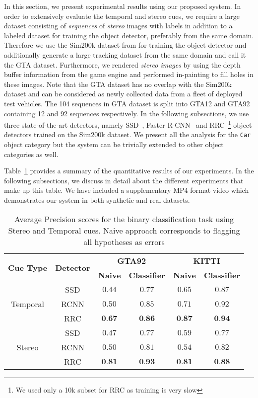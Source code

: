 \documentclass[letterpaper, 10 pt, journal, twoside]{IEEEtran}  %
\begin{document}
In this section, we present experimental results using our proposed system. In order to extensively evaluate the temporal and stereo cues, we require a large dataset consisting of \emph{sequences} of \emph{stereo} images with labels in addition to a labeled dataset for training the object detector, preferably from the same domain. Therefore we use the Sim200k dataset from \cite{johnson2017driving} for training the object detector and additionally generate a large tracking dataset from the same domain and call it the GTA dataset. Furthermore, we rendered \emph{stereo images} by using the depth buffer information from the game engine and performed in-painting \cite{bertalmio2001navier} to fill holes in these images. 
Note that the GTA dataset has no overlap with the Sim200k dataset and can be considered as newly collected data from a fleet of deployed test vehicles. The 104 sequences in GTA dataset is split into GTA12 and GTA92 containing 12 and 92 sequences respectively. In the following subsections, we use three state-of-the-art detectors, namely SSD~\cite{liu2016ssd}, Faster R-CNN~\cite{NIPS2015_5638} and RRC~\cite{ren2017accurate}\footnote{We used only a 10k subset for RRC as training is very slow} object detectors trained on the Sim200k dataset. We present all the analysis for the \texttt{Car} object category but the system can be trivially extended to other object categories as well.

Table~\ref{tbl:summary} provides a summary of the quantitative results of our experiments. In the following subsections, we discuss in detail about the different experiments that make up this table. We have included a supplementary MP4 format video which demonstrates our system in both synthetic and real datasets. 

\begin{table}[th]
\centering
\setlength\extrarowheight{2pt}
\begin{tabular}{|c|c|c|c|c|c|}
\hline
\multirow{2}{*}{\textbf{Cue Type}} & \multirow{2}{*}{\textbf{Detector}} & \multicolumn{2}{c|}{\textbf{GTA92}} & \multicolumn{2}{c|}{\textbf{KITTI}} \\[2pt] \cline{3-6}
 & & \textbf{Naive} & \textbf{Classifier} & \textbf{Naive} & \textbf{Classifier} \\[2pt]
\hline
\multirow{3}{*}{Temporal} & SSD & $0.44$ & $0.77$ & $0.65$ & $0.87$ \\
 & RCNN & $0.50$ & $0.85$ & $0.71$ & $0.92$ \\
 & RRC & $\textbf{0.67}$ & $\textbf{0.86}$ & $\textbf{0.87}$ & $\textbf{0.94}$ \\
\hline
\multirow{3}{*}{Stereo} & SSD &  $0.47$ & $0.77$ & $0.59$ & $0.77$ \\
 & RCNN & $0.50$ & $0.81$ & $0.54$ & $0.82$ \\
 & RRC & $\textbf{0.81}$ & $\textbf{0.93}$ & $\textbf{0.81}$ & $\textbf{0.88}$ \\
\hline
\end{tabular}
\caption{Average Precision scores for the binary classification task using Stereo and Temporal cues. Naive approach corresponds to flagging all hypotheses as errors}
\label{tbl:summary}
\end{table}
\end{document}
